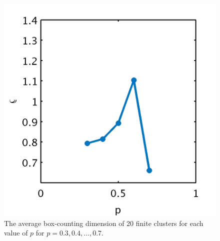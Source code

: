 \begin{figure}
	\centering
	\includegraphics[width=\columnwidth]{./img/assignment_fractal_rhoVSp}
	\caption{The average box-counting dimension of 20 finite clusters for each value of $p$ for $p = 0.3, 0.4, \dotsc, 0.7$.}
	\label{fig:assignment:fractal:dimensionVSp}
\end{figure}

